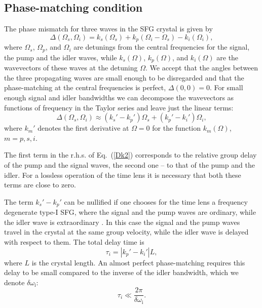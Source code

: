 \documentclass[10pt,twocolumn]{article}
\begin{document}
\subsection{Phase-matching condition}

The phase mismatch for three waves in the SFG crystal is given by
\begin{equation}\label{Dk}
\Delta(\Omega_s,\Omega_i)=k_s(\Omega_s)+k_p(\Omega_i-\Omega_s)-k_i(\Omega_i),
\end{equation}
where $\Omega_s$, $\Omega_p$, and $\Omega_i$ are detunings from the central frequencies for the signal, the pump and the idler waves, while $k_s(\Omega)$, $k_p(\Omega)$, and $k_i(\Omega)$ are the wavevectors of these waves at the detuning $\Omega$. We accept that the angles between the three propagating waves are small enough to be disregarded and that the phase-matching at the central frequencies is perfect, $\Delta(0,0)=0$. For small enough signal and idler bandwidths we can decompose the wavevectors as functions of frequency in the Taylor series and leave just the linear terms:
\begin{equation}\label{Dk2}
\Delta(\Omega_s,\Omega_i)\approx (k_s'-k_p')\Omega_s+(k_p'-k_i')\Omega_i,
\end{equation}
where $k_m'$ denotes the first derivative at $\Omega=0$ for the function $k_m(\Omega)$, $m=p,s,i$.

The first term in the r.h.s. of Eq.~(\ref{Dk2}) corresponds to the relative group delay of the pump and the signal waves, the second one -- to that of the pump and the idler. For a lossless operation of the time lens it is necessary that both these terms are close to zero.

The term $k_s'-k_p'$ can be nullified if one chooses for the time lens a frequency degenerate type-I SFG, where the signal and the pump waves are ordinary, while the idler wave is extraordinary \cite{Bennett1999}. In this case the signal and the pump waves travel in the crystal at the same group velocity, while the idler wave is delayed with respect to them. The total delay time is
\begin{equation}\label{taud}
\tau_i=|k_p'-k_i'|L,
\end{equation}
where $L$ is the crystal length. An almost perfect phase-matching requires this delay to be small compared to the inverse of the idler bandwidth, which we denote $\delta\omega_{\mathrm{i}}$:
\begin{equation}\label{limiti}
\tau_i \ll \frac{2\pi}{\delta\omega_{\mathrm{i}}}.
\end{equation}
\end{document}
